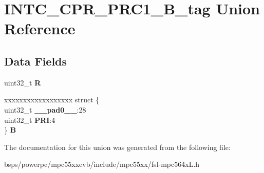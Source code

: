 \hypertarget{unionINTC__CPR__PRC1__32B__tag}{}\section{I\+N\+T\+C\+\_\+\+C\+P\+R\+\_\+\+P\+R\+C1\+\_\+B\+\_\+tag Union Reference}
\label{unionINTC__CPR__PRC1__32B__tag}
\subsection*{Data Fields}
\begin{DoxyCompactItemize}
\item 
\mbox{\label{unionINTC__CPR__PRC1__32B__tag_aa2674d9cec29b7f85707a4f1376b8e22}} 
uint32\+\_\+t {\bfseries R}
\item 
\mbox{\label{unionINTC__CPR__PRC1__32B__tag_a7331682fbba97689e54e38951005ba28}} 
\begin{tabbing}
xx\=xx\=xx\=xx\=xx\=xx\=xx\=xx\=xx\=\kill
struct \{\\
\>uint32\_t {\bfseries \_\_pad0\_\_}:28\\
\>uint32\_t {\bfseries PRI}:4\\
\} {\bfseries B}\\

\end{tabbing}\end{DoxyCompactItemize}


The documentation for this union was generated from the following file\+:\begin{DoxyCompactItemize}
\item 
bsps/powerpc/mpc55xxevb/include/mpc55xx/fsl-\/mpc564x\+L.\+h\end{DoxyCompactItemize}
